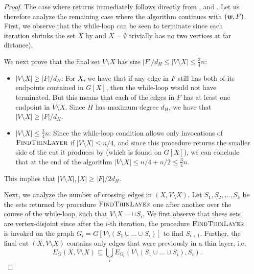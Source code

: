 \begin{proof}%
The case where  returns immediately follows directly from ,  and .
Let us therefore analyze the remaining case where the algorithm continues with $(\boldsymbol{\mathit{w}}, F)$.  First, we observe that the while-loop can be seen to terminate since each iteration shrinks the set $X$ by  and $X = \emptyset$ trivially has no two vertices at far distance). 

We next prove that the final set $V \setminus X$ has size $|F|/d_H \leq |V \setminus X| \leq \frac{3}{4}n$:
\begin{itemize}
    \item $|V \setminus X| \geq |F|/d_H$: For $X$, we have that if any edge in $F$ still has both of its endpoints contained in $G[X]$, then the while-loop would not have terminated. But this means that each of the edges in $F$ has at least one endpoint in $V \setminus X$. Since $H$ has maximum degree $d_H$, we have that $|V \setminus X| \geq |F|/d_H$. 
    
    \item $|V \setminus X| \leq \frac{3}{4}n$: Since the while-loop condition allows only invocations of $\textsc{FindThinLayer}$ if $|V \setminus X| \leq n/4$, and since this procedure returns the smaller side of the cut it produces by  (which is found on $G[X]$), we can conclude that at the end of the algorithm $|V \setminus X| \leq n/4 + n/2 \leq \frac{3}{4}n$.
\end{itemize}
This implies that $|V \setminus X|, |X| \geq |F|/2d_H$.

Next, we analyze the number of crossing edges in $(X, V \setminus X).$
Let $S_1, S_2, \ldots, S_k$ be the sets returned by procedure $\textsc{FindThinLayer}$ one after another over the course of the while-loop, such that $V \setminus X = \cup S_i$. We first observe that these sets are vertex-disjoint since after the $i$-th iteration, the procedure $\textsc{FindThinLayer}$ is invoked on the graph $G_i = G[V \setminus (S_1 \cup \ldots \cup S_i)]$ to find $S_{i+1}$.
Further, the final cut $(X, V \setminus X)$ contains only edges that were previously in a thin layer, i.e. \[
E_G(X, V \setminus X) \subseteq \bigcup_i E_{G_i}(V \setminus (S_1 \cup \ldots \cup S_i), S_i).
\]


\end{proof}
